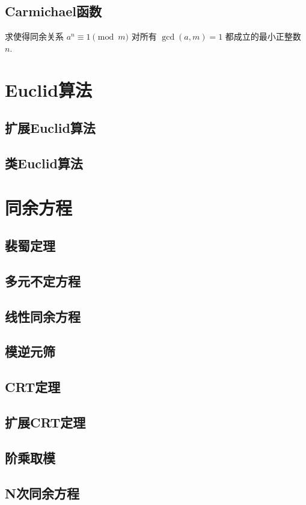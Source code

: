 \documentclass[12pt,a4paper]{article}
\begin{document}
\subsection{Carmichael函数}
\begin{mdframed}[leftline=true, linewidth=2pt, linecolor=gray]
	求使得同余关系 $a^n\equiv 1\pmod{m}$ 对所有 $\gcd(a,m)=1$ 都成立的最小正整数 $n$. 
\end{mdframed}
\newpage
\section{Euclid算法}
\subsection{扩展Euclid算法} %
\subsection{类Euclid算法}
\newpage
\section{同余方程}
\subsection{裴蜀定理}
\subsection{多元不定方程}
\subsection{线性同余方程}
\subsection{模逆元筛}
\subsection{CRT定理}
\subsection{扩展CRT定理}
\subsection{阶乘取模}
\subsection{N次同余方程}
\newpage
\end{document}
